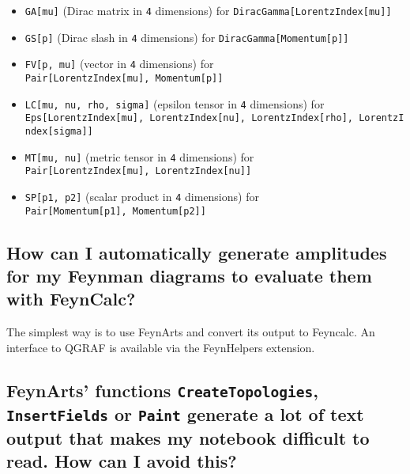 \documentclass[../FeynCalcManual.tex]{subfiles}
\begin{document}
\begin{itemize}
\tightlist
\item
  \texttt{GA[\allowbreak{}mu]} (Dirac matrix in \texttt{4} dimensions)
  for \texttt{DiracGamma[\allowbreak{}LorentzIndex[\allowbreak{}mu]]}
\item
  \texttt{GS[\allowbreak{}p]} (Dirac slash in \texttt{4} dimensions) for
  \texttt{DiracGamma[\allowbreak{}Momentum[\allowbreak{}p]]}
\item
  \texttt{FV[\allowbreak{}p,\ \allowbreak{}mu]} (vector in \texttt{4}
  dimensions) for
  \texttt{Pair[\allowbreak{}LorentzIndex[\allowbreak{}mu],\ \allowbreak{}Momentum[\allowbreak{}p]]}
\item
  \texttt{LC[\allowbreak{}mu,\ \allowbreak{}nu,\ \allowbreak{}rho,\ \allowbreak{}sigma]}
  (epsilon tensor in \texttt{4} dimensions) for
  \texttt{Eps[\allowbreak{}LorentzIndex[\allowbreak{}mu],\ \allowbreak{}LorentzIndex[\allowbreak{}nu],\ \allowbreak{}LorentzIndex[\allowbreak{}rho],\ \allowbreak{}LorentzIndex[\allowbreak{}sigma]]}
\item
  \texttt{MT[\allowbreak{}mu,\ \allowbreak{}nu]} (metric tensor in
  \texttt{4} dimensions) for
  \texttt{Pair[\allowbreak{}LorentzIndex[\allowbreak{}mu],\ \allowbreak{}LorentzIndex[\allowbreak{}nu]]}
\item
  \texttt{SP[\allowbreak{}p1,\ \allowbreak{}p2]} (scalar product in
  \texttt{4} dimensions) for
  \texttt{Pair[\allowbreak{}Momentum[\allowbreak{}p1],\ \allowbreak{}Momentum[\allowbreak{}p2]]}
\end{itemize}

\subsection{How can I automatically generate amplitudes for my Feynman
diagrams to evaluate them with
FeynCalc?}\label{how-can-i-automatically-generate-amplitudes-for-my-feynman-diagrams-to-evaluate-them-with-feyncalc}

The simplest way is to use FeynArts and convert its output to Feyncalc.
An interface to QGRAF is available via the FeynHelpers extension.

\subsection{\texorpdfstring{FeynArts' functions
\texttt{CreateTopologies}, \texttt{InsertFields} or \texttt{Paint}
generate a lot of text output that makes my notebook difficult to read.
How can I avoid
this?}{FeynArts' functions ,  or  generate a lot of text output that makes my notebook difficult to read. How can I avoid this?}}\label{feynarts-functions-createtopologies-insertfields-or-paint-generate-a-lot-of-text-output-that-makes-my-notebook-difficult-to-read.-how-can-i-avoid-this}
\end{document}
